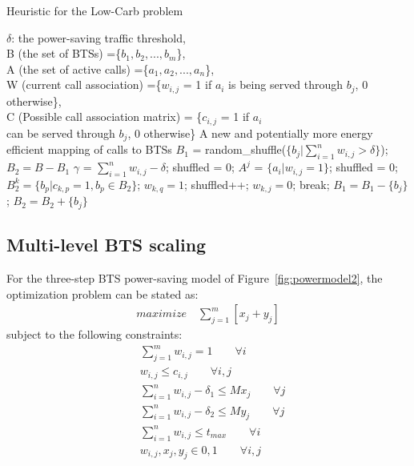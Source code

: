 \begin{algorithm}
\caption{Heuristic for the Low-Carb problem}
\label{algo:heur2}
\begin{algorithmic}[1]
\REQUIRE $\delta$: the power-saving traffic threshold,\\B (the set of BTSs) =\{$b_1, b_2, ..., b_m$\},\\A (the set of active calls) =\{$a_1, a_2, ..., a_n$\},\\W (current call association) =\{$w_{i,j}$ = 1 if $a_i$ is being served through $b_j$, 0 otherwise\},\\C (Possible call association matrix) = \{$c_{i,j}$ = 1 if $a_i$ \\can be served through $b_j$, 0 otherwise\}
\ENSURE A new and potentially more energy efficient mapping of calls to BTSs
\STATE $B_1$ = random\_shuffle($\{b_j | \sum\limits_{i=1}^{n}w_{i,j}>\delta\}$); 
\STATE $B_2=B - B_1$
	\STATE $\gamma$ = $\sum\limits_{i=1}^{n}w_{i,j} - \delta$; \quad shuffled = 0;
	\STATE $A^j$ = $\{a_i | w_{i,j}=1\}$; \quad shuffled = 0;
			\STATE $B_2^k = \{b_p | c_{k,p}=1, b_p \in B_2\}$;
					\STATE $w_{k,q} = 1$; \quad shuffled++;
					\STATE $w_{k,j} = 0$; \quad break;
				\ENDIF
			\ENDFOR
		\ENDIF
	\ENDFOR
\STATE $B_1 = B_1 - \{b_j\}$; \quad $B_2 = B_2 + \{b_j\}$
\ENDIF
\ENDFOR
\end{algorithmic}
\end{algorithm}

\subsection{Multi-level BTS scaling}
\label{subsec:case2:multilevel}
For the three-step BTS power-saving model of Figure~\ref{fig:powermodel2}, the optimization problem can be stated as:
\begin{align}
\textit{maximize} \quad \sum_{j=1}^{m} \left[
x_j+y_j
\right]
\end{align}
subject to the following constraints:
\begin{align}
& \sum_{j=1}^m w_{i,j} = 1 \qquad \forall i \\
& w_{i,j} \leq c_{i,j} \qquad \forall i, j \\
& \sum_{i=1}^nw_{i,j}-\delta_1 \leq Mx_j \qquad \forall j\\
& \sum_{i=1}^nw_{i,j}-\delta_2 \leq My_j \qquad \forall j\\
& \sum_{i=1}^n w_{i,j} \le t_{max} \qquad \forall i \\
& w_{i,j}, x_j, y_j\in {0,1} \qquad \forall i, j%
\end{align}

